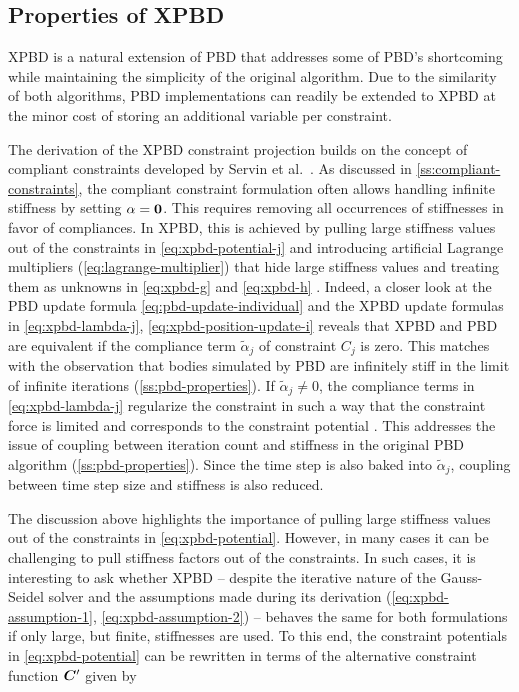 \subsection{Properties of XPBD}\label{ss:xpbd-properties}
XPBD is a natural extension of PBD that addresses some of PBD's shortcoming while maintaining the simplicity of the original algorithm. Due to
the similarity of both algorithms, PBD implementations can readily be extended to XPBD at the minor cost of storing an additional variable per 
constraint.

The derivation of the XPBD constraint projection builds on the concept of compliant constraints developed by Servin et al.\ 
\cite{servin2006}. As discussed in \cref{ss:compliant-constraints}, the compliant constraint formulation often allows handling infinite stiffness by
setting $\mathbf{\alpha} = \mathbf{0}$. This requires removing all occurrences of stiffnesses in favor of compliances. In XPBD, this is achieved by
pulling large stiffness values out of the constraints in \autoref{eq:xpbd-potential-j} and introducing artificial Lagrange multipliers 
(\cref{eq:lagrange-multiplier}) that hide large stiffness values and treating them as unknowns in \autoref{eq:xpbd-g} and \autoref{eq:xpbd-h} . 
Indeed, a closer look at the PBD update formula 
\autoref{eq:pbd-update-individual} and the XPBD update formulas in \autoref{eq:xpbd-lambda-j}, \autoref{eq:xpbd-position-update-i} reveals that XPBD and 
PBD are equivalent if the compliance term $\tilde{\alpha}_j$ of constraint $C_j$ is zero. This matches with the observation that bodies 
simulated by PBD are infinitely stiff in the limit of infinite iterations (\cref{ss:pbd-properties}). If $\tilde{\alpha}_j \neq 0$, the 
compliance terms in \autoref{eq:xpbd-lambda-j} regularize the constraint in such a way that the constraint force is limited and corresponds 
to the constraint potential \cite{macklin2016}. This addresses the issue of coupling
between iteration count and stiffness in the original PBD algorithm (\cref{ss:pbd-properties}). Since the time step is also baked into 
$\tilde{\alpha}_j$, coupling between time step size and stiffness is also reduced.

The discussion above highlights the importance of pulling large stiffness values out of the constraints in \autoref{eq:xpbd-potential}. 
However, in many cases it can be challenging to pull stiffness factors out of the constraints. In such cases, it is interesting to ask 
whether XPBD -- despite the iterative nature of the Gauss-Seidel solver and the assumptions made during its derivation 
(\cref{eq:xpbd-assumption-1}, \cref{eq:xpbd-assumption-2}) -- behaves the same for both formulations if only large, but finite, 
stiffnesses are used.
To this end, the constraint potentials in \autoref{eq:xpbd-potential} can be rewritten in terms of the alternative constraint 
function $\bm{C}^{\prime}$ given by

